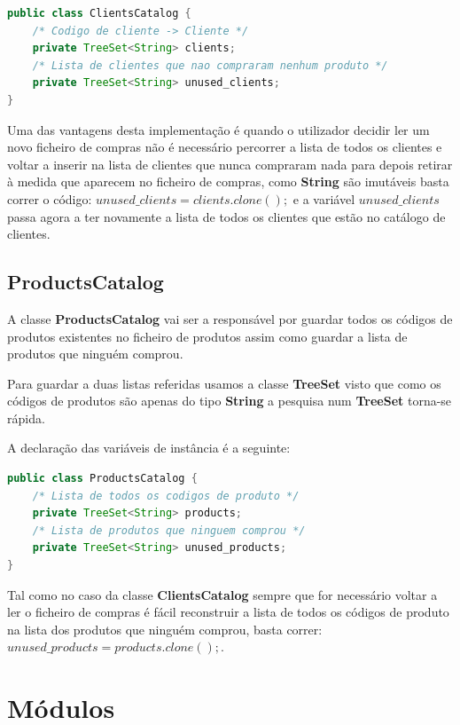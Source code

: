 \documentclass[10pt] {article}
\begin{document}
\begin{lstlisting}[language=Java]
public class ClientsCatalog {
	/* Codigo de cliente -> Cliente */
	private TreeSet<String> clients;
	/* Lista de clientes que nao compraram nenhum produto */
	private TreeSet<String> unused_clients;
}
\end{lstlisting}

\par Uma das vantagens desta implementação é quando o utilizador decidir ler um novo ficheiro de compras não é necessário 
percorrer a lista de todos os clientes e voltar a inserir na lista de clientes que nunca compraram nada para depois retirar à 
medida que aparecem no ficheiro de compras, como \textbf{String} são imutáveis basta correr o código: 
$unused\_clients = clients.clone();$ e a variável $unused\_clients$ passa agora a ter novamente a lista de todos os clientes que estão no catálogo de clientes.

\subsection{ProductsCatalog}
\par A classe \textbf{ProductsCatalog} vai ser a responsável por guardar todos os códigos de produtos existentes no ficheiro de 
produtos assim como guardar a lista de produtos que ninguém comprou.
\par Para guardar a duas listas referidas usamos a classe \textbf{TreeSet} visto que como os códigos de produtos são apenas 
do tipo \textbf{String} a pesquisa num \textbf{TreeSet} torna-se rápida.
\par A declaração das variáveis de instância é a seguinte:

\begin{lstlisting}[language=Java]
public class ProductsCatalog {
	/* Lista de todos os codigos de produto */
	private TreeSet<String> products;
	/* Lista de produtos que ninguem comprou */
	private TreeSet<String> unused_products;
}
\end{lstlisting}

\par Tal como no caso da classe \textbf{ClientsCatalog} sempre que for necessário voltar a ler o ficheiro de compras é fácil 
reconstruir a lista de todos os códigos de produto na lista dos produtos que ninguém comprou, basta correr: 
$unused\_products = products.clone();$.

\newpage
\section{Módulos}
\end{document}
